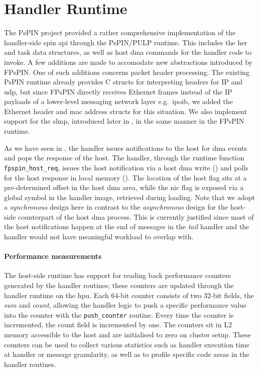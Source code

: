 \section{Handler Runtime} \label{sec:handler-runtime}

The PsPIN project provided a rather comprehensive implementation of the handler-side \ac{spin} \ac{api} through the PsPIN/PULP runtime.  This includes the \ac{her} and task data structures, as well as host \ac{dma} commands for the handler code to invoke.  A few additions are made to accomodate new abstractions introduced by FPsPIN.  One of such additions concerns packet header processing.  The existing PsPIN runtime already provides C structs for interpreting headers for IP and \ac{udp}, but since FPsPIN directly receives Ethernet frames instead of the IP payloads of a lower-level messaging network layer e.g.\ \ac{ipoib}, we added the Ethernet header and \ac{mac} address structs for this situation.  We also implement support for the \ac{slmp}, introduced later in , in the same manner in the FPsPIN runtime.

As we have seen in , the handler issues notifications to the host for \ac{dma} events and pops the response of the host.  The handler, through the runtime function \texttt{fpspin\_\-host\_\-req}, issues the host notification via a host \ac{dma} write () and polls for the host response in local memory ().  The location of the host flag sits at a pre-determined offset in the host \ac{dma} area, while the \ac{nic} flag is exposed via a global symbol in the handler image, retrieved during loading.  Note that we adopt a \emph{synchronous} design here in contrast to the \emph{asynchronous} design for the host-side counterpart of the host \ac{dma} process.  This is currently justified since most of the host notifications happen at the end of messages in the \emph{tail} handler and the handler would not have meaningful workload to overlap with.

\paragraph{Performance measurements} The host-side runtime has support for reading back performance counters generated by the handler routines; these counters are updated through the handler runtime on the \ac{hpu}.  Each 64-bit counter consists of two 32-bit fields, the \emph{sum} and \emph{count}, allowing the handler logic to push a specific performance value into the counter with the \texttt{push\_\-counter} routine.  Every time the counter is incremented, the count field is incremented by one.  The counters sit in L2 memory accessible to the host and are initialised to zero on cluster setup.  These counters can be used to collect various statistics such as handler execution time at handler or message granularity,  as well as to profile specific code areas in the handler routines. 

